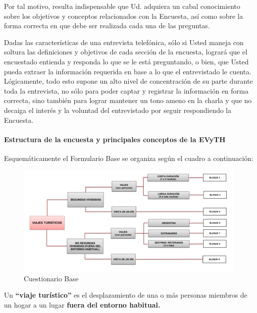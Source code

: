 \documentclass[
  openany]{book}
\begin{document}
Por tal motivo, resulta indispensable que Ud. adquiera un cabal conocimiento sobre los objetivos y conceptos relacionados con la Encuesta, así como sobre la forma correcta en que debe ser realizada cada una de las preguntas.

Dadas las características de una entrevista telefónica, sólo si Usted maneja con soltura las definiciones y objetivos de cada sección de la encuesta, logrará que el encuestado entienda y responda lo que se le está preguntando, o bien, que Usted pueda extraer la información requerida en base a lo que el entrevistado le cuenta. Lógicamente, todo esto supone un alto nivel de concentración de su parte durante toda la entrevista, no sólo para poder captar y registrar la información en forma correcta, sino también para lograr mantener un tono ameno en la charla y que no decaiga el interés y la voluntad del entrevistado por seguir respondiendo la Encuesta.

\hypertarget{estructura-de-la-encuesta-y-principales-conceptos-de-la-evyth}{%
\paragraph{Estructura de la encuesta y principales conceptos de la EVyTH}\label{estructura-de-la-encuesta-y-principales-conceptos-de-la-evyth}}

Esquemáticamente el Formulario Base se organiza según el cuadro a continuación:

\begin{figure}

{\centering \includegraphics[width=1\linewidth]{imagenes/figura6-20} 

}

\caption{Cuestionario Base}\label{fig:Cuestionario}
\end{figure}

Un \textbf{``viaje turístico''} es el desplazamiento de una o más personas miembros de un hogar a un lugar \textbf{fuera del entorno habitual.}
\end{document}
